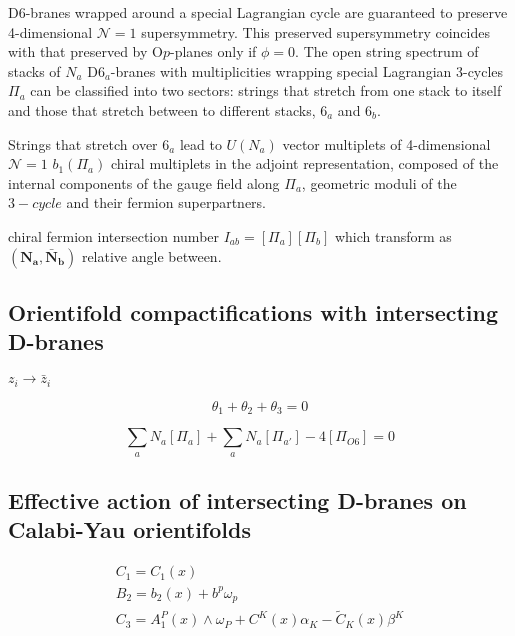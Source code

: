 D6-branes wrapped around a special Lagrangian cycle are guaranteed to preserve 4-dimensional $\mathcal N=1$ supersymmetry. 
This preserved supersymmetry coincides with that preserved by O$p$-planes only if $\phi=0$.
The open string spectrum of stacks of $N_a$ D$6_a$-branes with multiplicities wrapping special Lagrangian 3-cycles $\Pi_a$ 
can be classified into two sectors: strings that stretch from one stack to itself and those that stretch between to different stacks, $6_a$ and $6_b$.

Strings that stretch over $6_a$ lead to $U(N_a)$ vector multiplets of 4-dimensional $\mathcal N=1$
$b_1(\Pi_a)$ chiral multiplets in the adjoint representation,
composed of the internal components of the gauge field along $\Pi_a$,
geometric moduli of the $3-cycle$ and their fermion superpartners.

  chiral fermion intersection number $I_{ab}=[\Pi_a][\Pi_b]$ which transform as $(\mathbf{N_a},\mathbf{\bar N_b})$ relative angle between.

\subsection{Orientifold compactifications with intersecting D-branes}

$z_i \to \bar z_i$

\begin{equation}
  \theta_1 + \theta_2 + \theta_3 = 0
\end{equation}

\begin{equation}
  \sum_a N_a [\Pi_a] + \sum_a N_{a} [\Pi_{a'}] - 4 [\Pi_{O6}]=0
\end{equation}

\subsection{Effective action of intersecting D-branes on Calabi-Yau orientifolds}

\begin{equation}
\begin{aligned}
C_1 = C_1(x)\\
B_2 = b_2(x)+b^p \omega_p \\
C_3 = A_1^P(x)\wedge \omega_P + C^K(x)\alpha_K -\tilde C_K(x)\beta^K
\end{aligned}
\end{equation}


